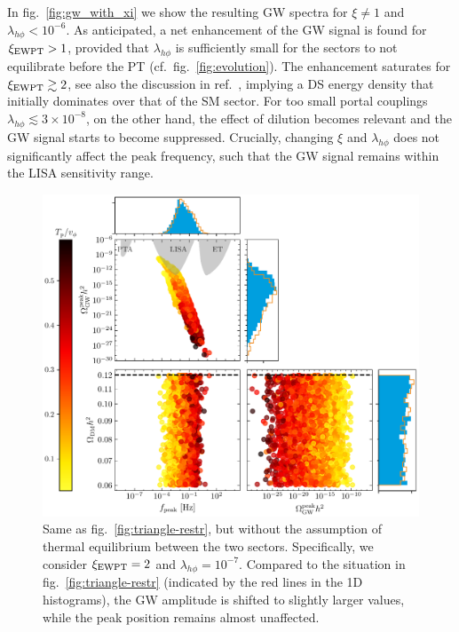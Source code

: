 In fig.~\ref{fig:gw_with_xi} we show the resulting \ac{GW} spectra for $\xi \neq 1$ and $\lambda_{h\phi} < 10^{-6}$. As anticipated, a net enhancement of the \ac{GW} signal is found for $\xi_{\text{EWPT}} > 1$, provided that $\lambda_{h\phi}$ is sufficiently small for the sectors to not equilibrate before the \ac{PT} (cf.~fig.~\ref{fig:evolution}). The enhancement saturates for $\xi_{\text{EWPT}} \gtrsim 2$, see also the discussion in ref.~\cite{Ertas:2021xeh}, implying a \ac{DS} energy density that initially  dominates over that of the \ac{SM} sector. For too small portal couplings $\lambda_{h\phi} \lesssim 3 \times 10^{-8}$, on the other hand, the effect of dilution becomes relevant and the \ac{GW} signal starts to become suppressed. Crucially, changing $\xi$ and $\lambda_{h\phi}$ does not significantly affect the peak frequency, such that the \ac{GW} signal remains within the \ac{LISA} sensitivity range.

\begin{figure}[t]
	\centering \includegraphics[width=\textwidth]{thesisplots/lisa/thesis_LISA_12}
	\caption{Same as fig.~\ref{fig:triangle-restr}, but without the assumption of thermal equilibrium between the two sectors. Specifically, we consider $\xi_{\text{EWPT}} = 2$ and $\lambda_{h\phi} = 10^{-7}$. Compared to the situation in fig.~\ref{fig:triangle-restr}  (indicated by the red lines in the 1D histograms), the \ac{GW} amplitude is shifted to slightly larger values, while the peak position remains almost unaffected.}
	\label{fig:triangle-xi2}
\end{figure}

